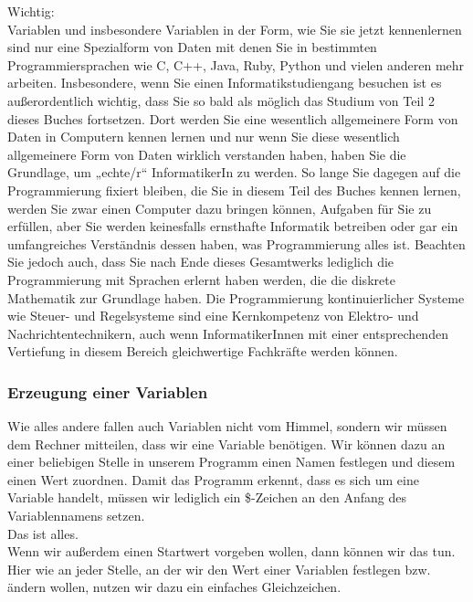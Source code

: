 Wichtig: \\

Variablen und insbesondere Variablen in der Form, wie Sie sie jetzt kennenlernen sind nur eine Spezialform von Daten mit denen Sie in bestimmten Programmiersprachen wie C, C++, Java, Ruby, Python und vielen anderen mehr arbeiten. Insbesondere, wenn Sie einen Informatikstudiengang besuchen ist es außerordentlich wichtig, dass Sie so bald als möglich das Studium von Teil 2 dieses Buches fortsetzen. Dort werden Sie eine wesentlich allgemeinere Form von Daten in Computern kennen lernen und nur wenn Sie diese wesentlich allgemeinere Form von Daten wirklich verstanden haben, haben Sie die Grundlage, um „echte/r“ InformatikerIn zu werden. So lange Sie dagegen auf die Programmierung fixiert bleiben, die Sie in diesem Teil des Buches kennen lernen, werden Sie zwar einen Computer dazu bringen können, Aufgaben für Sie zu erfüllen, aber Sie werden keinesfalls ernsthafte Informatik betreiben oder gar ein umfangreiches Verständnis dessen haben, was Programmierung alles ist. Beachten Sie jedoch auch, dass Sie nach Ende dieses Gesamtwerks lediglich die Programmierung mit Sprachen erlernt haben werden, die die diskrete Mathematik zur Grundlage haben. Die Programmierung kontinuierlicher Systeme wie Steuer- und Regelsysteme sind eine Kernkompetenz von Elektro- und Nachrichtentechnikern, auch wenn InformatikerInnen mit einer entsprechenden Vertiefung in diesem Bereich gleichwertige Fachkräfte werden können.

\subsubsection{Erzeugung einer Variablen}

Wie alles andere fallen auch Variablen nicht vom Himmel, sondern wir müssen dem Rechner mitteilen, dass wir eine Variable benötigen. Wir können dazu an einer beliebigen Stelle in unserem Programm einen Namen festlegen und diesem einen Wert zuordnen. Damit das Programm erkennt, dass es sich um eine Variable handelt, müssen wir lediglich ein \$-Zeichen an den Anfang des Variablennamens setzen. \\

Das ist alles.\\

Wenn wir außerdem einen Startwert vorgeben wollen, dann können wir das tun. Hier wie an jeder Stelle, an der wir den Wert einer Variablen festlegen bzw. ändern wollen, nutzen wir dazu ein einfaches Gleichzeichen.\\

